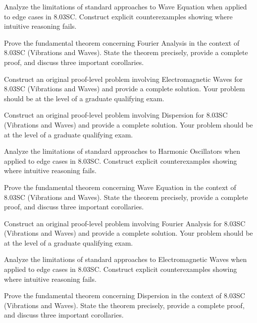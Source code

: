 \documentclass[12pt,a4paper]{exam}
\begin{document}
\begin{questions}
\vspace{0.3cm}

\question[3]
Analyze the limitations of standard approaches to Wave Equation when applied to edge cases in 8.03SC. Construct explicit counterexamples showing where intuitive reasoning fails.

\vspace{0.3cm}

\question[5]
Prove the fundamental theorem concerning Fourier Analysis in the context of 8.03SC (Vibrations and Waves). State the theorem precisely, provide a complete proof, and discuss three important corollaries.

\vspace{0.3cm}

\question[8]
Construct an original proof-level problem involving Electromagnetic Waves for 8.03SC (Vibrations and Waves) and provide a complete solution. Your problem should be at the level of a graduate qualifying exam.

\vspace{0.3cm}

\question[4]
Construct an original proof-level problem involving Dispersion for 8.03SC (Vibrations and Waves) and provide a complete solution. Your problem should be at the level of a graduate qualifying exam.

\vspace{0.3cm}

\question[4]
Analyze the limitations of standard approaches to Harmonic Oscillators when applied to edge cases in 8.03SC. Construct explicit counterexamples showing where intuitive reasoning fails.

\vspace{0.3cm}

\question[3]
Prove the fundamental theorem concerning Wave Equation in the context of 8.03SC (Vibrations and Waves). State the theorem precisely, provide a complete proof, and discuss three important corollaries.

\vspace{0.3cm}

\question[6]
Construct an original proof-level problem involving Fourier Analysis for 8.03SC (Vibrations and Waves) and provide a complete solution. Your problem should be at the level of a graduate qualifying exam.

\vspace{0.3cm}

\question[3]
Analyze the limitations of standard approaches to Electromagnetic Waves when applied to edge cases in 8.03SC. Construct explicit counterexamples showing where intuitive reasoning fails.

\vspace{0.3cm}

\question[4]
Prove the fundamental theorem concerning Dispersion in the context of 8.03SC (Vibrations and Waves). State the theorem precisely, provide a complete proof, and discuss three important corollaries.

\vspace{0.3cm}

\end{questions}
\end{document}

